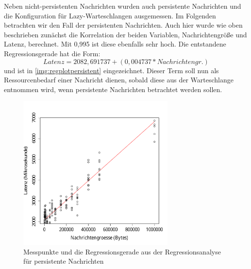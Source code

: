 \par
Neben nicht-persistenten Nachrichten wurden auch persistente Nachrichten und die Konfiguration für Lazy-Warteschlangen ausgemessen. Im Folgenden betrachten wir den Fall der persistenten Nachrichten. Auch hier wurde wie oben beschrieben zunächst die Korrelation der beiden Variablen, Nachrichtengröße und Latenz, berechnet. Mit 0,995 ist diese ebenfalls sehr hoch. Die entstandene Regressionsgerade hat die Form: \[Latenz = 2082,691737 + (0,004737 * Nachrichtengr.)\] und ist in \autoref{img:regplotpersistent} eingezeichnet. Dieser Term soll nun als Ressourcenbedarf einer Nachricht dienen, sobald diese aus der Warteschlange entnommen wird, wenn persistente Nachrichten betrachtet werden sollen.
\begin{figure}
\center
  \includegraphics[width=0.7\textwidth]{images/modelling/persistentRegression.pdf}
  \caption{Messpunkte und die Regressionsgerade aus der Regressionsanalyse für persistente Nachrichten}
  \label{img:regplotpersistent}
\end{figure}

